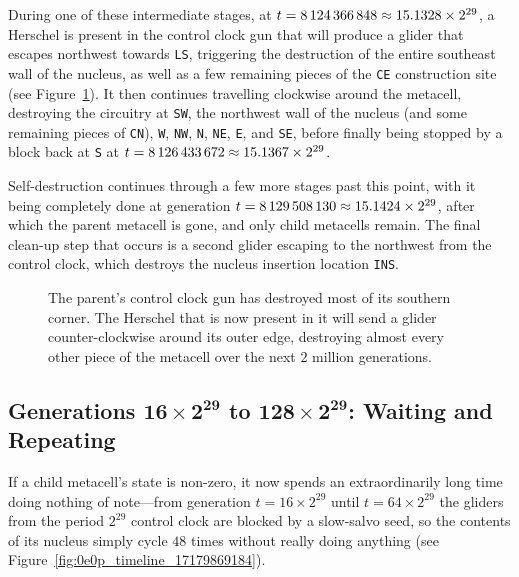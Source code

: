 During one of these intermediate stages, at $t = 8{\,}124{\,}366{\,}848 \approx 15.1328 \times 2^{29}$, a Herschel is present in the control clock gun that will produce a glider that escapes northwest towards \texttt{LS}, triggering the destruction of the entire southeast wall of the nucleus, as well as a few remaining pieces of the \texttt{CE} construction site (see Figure~\ref{fig:0e0p_timeline_8124366848}). It then continues travelling clockwise around the metacell, destroying the circuitry at \texttt{SW}, the northwest wall of the nucleus (and some remaining pieces of \texttt{CN}), \texttt{W}, \texttt{NW}, \texttt{N}, \texttt{NE}, \texttt{E}, and \texttt{SE}, before finally being stopped by a block back at \texttt{S} at $t = 8{\,}126{\,}433{\,}672 \approx 15.1367 \times 2^{29}$.

Self-destruction continues through a few more stages past this point, with it being completely done at generation $t = 8{\,}129{\,}508{\,}130 \approx 15.1424 \times 2^{29}$, after which the parent metacell is gone, and only child metacells remain. The final clean-up step that occurs is a second glider escaping to the northwest from the control clock, which destroys the nucleus insertion location \texttt{INS}.

\begin{figure}[!htb]
	\centering
	\caption{The parent's control clock gun has destroyed most of its southern corner. The Herschel that is now present in it will send a glider counter-clockwise around its outer edge, destroying almost every other piece of the metacell over the next $2$ million generations.}
	\label{fig:0e0p_timeline_8124366848}
\end{figure}


\subsection{Generations $\mathbf{16 \times 2^{29}}$ to $\mathbf{128 \times 2^{29}}$: Waiting and Repeating}\label{sec:0e0p_timeline_wait_repeat}

If a child metacell's state is non-zero, it now spends an extraordinarily long time doing nothing of note---from generation $t = 16 \times 2^{29}$ until $t = 64 \times 2^{29}$ the gliders from the period $2^{29}$ control clock are blocked by a slow-salvo seed, so the contents of its nucleus simply cycle $48$ times without really doing anything (see Figure~\ref{fig:0e0p_timeline_17179869184}).

